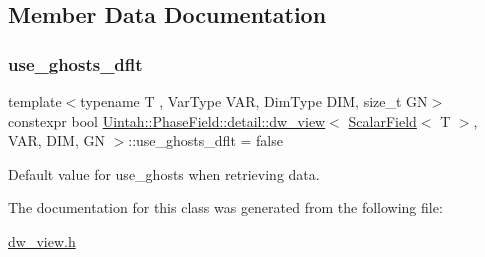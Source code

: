 \subsection{Member Data Documentation}
\mbox{\label{classUintah_1_1PhaseField_1_1detail_1_1dw__view_3_01ScalarField_3_01T_01_4_00_01VAR_00_01DIM_00_01GN_01_4_a6d76ec22f8cb6a0aff18f14f846950b0}} 
\subsubsection{\texorpdfstring{use\+\_\+ghosts\+\_\+dflt}{use\_ghosts\_dflt}}
{\footnotesize\ttfamily template$<$typename T , Var\+Type V\+AR, Dim\+Type D\+IM, size\+\_\+t GN$>$ \\
constexpr bool \hyperlink{classUintah_1_1PhaseField_1_1detail_1_1dw__view}{Uintah\+::\+Phase\+Field\+::detail\+::dw\+\_\+view}$<$ \hyperlink{structUintah_1_1PhaseField_1_1ScalarField}{Scalar\+Field}$<$ T $>$, V\+AR, D\+IM, GN $>$\+::use\+\_\+ghosts\+\_\+dflt = false\hspace{0.3cm}{\ttfamily [static]}}



Default value for use\+\_\+ghosts when retrieving data. 



The documentation for this class was generated from the following file\+:\begin{DoxyCompactItemize}
\item 
\hyperlink{dw__view_8h}{dw\+\_\+view.\+h}\end{DoxyCompactItemize}
